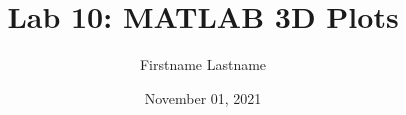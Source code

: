 \newcommand{\course}{MATH 3341}
\title{Lab 10: MATLAB 3D Plots}
\author{Firstname Lastname}
\date{November 01, 2021}
